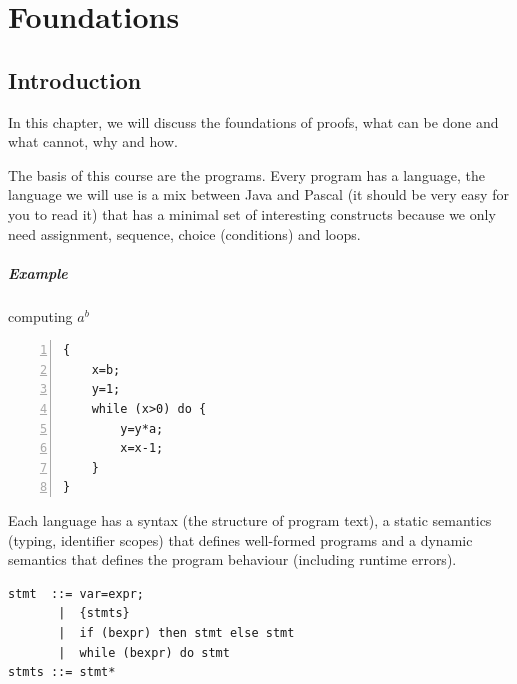 \documentclass[12pt, a4paper]{book}
\begin{document}
  \chapter{Foundations}
  \label{chap:Foundations}

  \section{Introduction}
  \label{sec:Introduction}

In this chapter, we will discuss the foundations of proofs, what can be done
and what cannot, why and how. \newline

The basis of this course are the programs. Every program has a language, the
language we will use is a mix between Java and Pascal (it should be very
easy for you to read it) that has a minimal set of interesting constructs
because we only need assignment, sequence, choice (conditions) and loops.
\newline

\paragraph{Example} computing $a^b$
\begin{lstlisting}[numbers=left,caption={Example of code},label=code:basiccode]
{
    x=b;
    y=1;
    while (x>0) do {
        y=y*a;
        x=x-1;
    }
}
\end{lstlisting}

Each language has a syntax (the structure of program text), a static semantics
(typing, identifier scopes) that defines well-formed programs and a dynamic
semantics that defines the program behaviour (including runtime errors).
\newline

\begin{verbatim}
stmt  ::= var=expr;
       |  {stmts}
       |  if (bexpr) then stmt else stmt
       |  while (bexpr) do stmt
stmts ::= stmt*
\end{verbatim}
\end{document}
